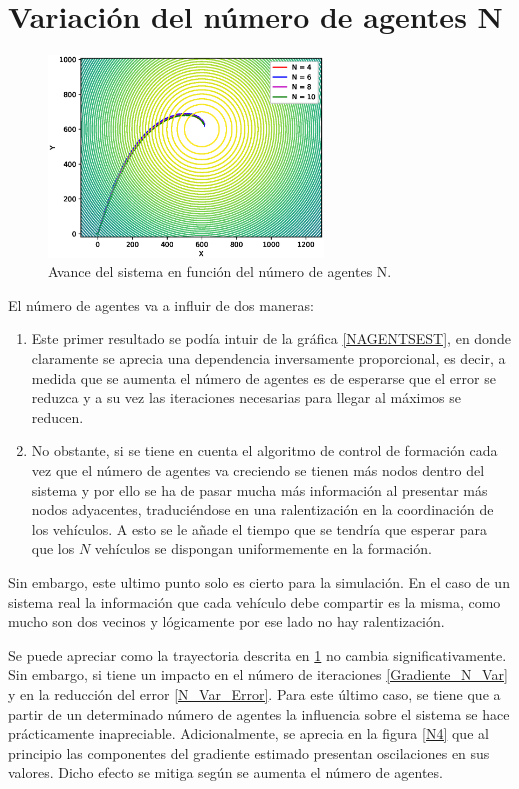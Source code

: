 \section{Variación del número de agentes N}

\begin{figure}[H]
\centering
\includegraphics[width=0.65\textwidth]{figures/N_Var_R_50/Figure_1.eps}
\caption{Avance del sistema en función del número de agentes N.} \label{N_Var}
\end{figure}

El número de agentes va a influir de dos maneras: 

\begin{enumerate}
	\item Este primer resultado se podía intuir de la gráfica \ref{NAGENTSEST}, en donde claramente se aprecia una dependencia inversamente proporcional, es decir, a medida que se aumenta el número de agentes es de esperarse que el error se reduzca y a su vez las iteraciones necesarias para llegar al máximos se reducen.
	\item No obstante, si se tiene en cuenta el algoritmo de control de formación  cada vez que el número de agentes va creciendo se tienen más nodos dentro del sistema y por ello se ha de pasar mucha más información al presentar más nodos adyacentes, traduciéndose en una ralentización en la coordinación de los vehículos. A esto se le añade el tiempo que se tendría que esperar para que los $N$ vehículos se dispongan uniformemente en la formación.
\end{enumerate}

Sin embargo, este ultimo punto solo es cierto para la simulación. En el caso de un sistema real la información que cada vehículo debe compartir es la misma, como mucho son dos vecinos y lógicamente por ese lado no hay ralentización.

Se puede apreciar como la trayectoria descrita en \ref{N_Var} no cambia significativamente. Sin embargo, si tiene un impacto en el número de iteraciones \ref{Gradiente_N_Var} y en la reducción del error \ref{N_Var_Error}. Para este último caso, se tiene que a partir de un determinado número de agentes la influencia sobre el sistema se hace prácticamente inapreciable. Adicionalmente, se aprecia en la figura \ref{N4} que al principio las componentes del gradiente estimado presentan oscilaciones en sus valores. Dicho efecto se mitiga según se aumenta el número de agentes.

